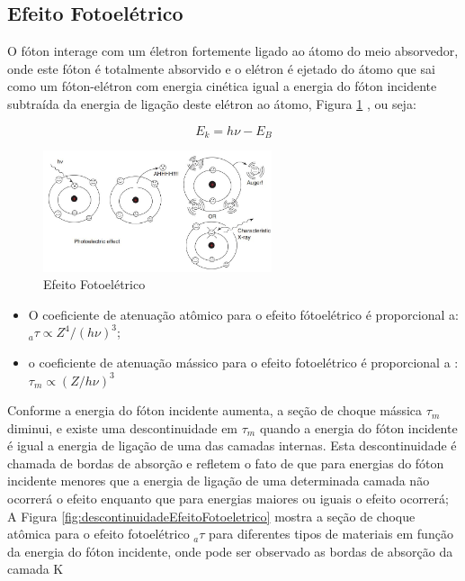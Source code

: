 \documentclass[11pt,a4paper]{article}
\begin{document}
        \subsection{Efeito Fotoelétrico}

            O fóton interage com um életron fortemente ligado ao átomo do meio absorvedor, onde este fóton é totalmente absorvido e o elétron é ejetado do átomo que sai como um fóton-elétron com energia cinética igual a energia do fóton incidente subtraída da energia de ligação deste elétron ao átomo, Figura \ref{fig:efeitoFotoeletrico} , ou seja:



                \begin{equation}
                    E_k = h\nu - E_B
                \end{equation}

                \begin{figure}[h]
                    \centering
                    \includegraphics[width=0.6\textwidth]{Imagens/efeitoFotoeletrico.JPG}
                    \caption{Efeito Fotoelétrico}
                    \label{fig:efeitoFotoeletrico}
                \end{figure}


            \begin{itemize}
                \item O coeficiente de atenuação atômico para o efeito fótoelétrico é proporcional a: ${}_a\tau \propto Z^4 / (h\nu)^3$;
                \item o coeficiente de atenuação mássico para o efeito fotoelétrico é proporcional a
                : $\tau_m \propto (Z / h\nu)^3$
            \end{itemize}

            Conforme a energia do fóton incidente aumenta, a seção de choque mássica $\tau_m$ diminui, e existe uma descontinuidade em $\tau_m$ quando a energia do fóton incidente é igual a energia de ligação de uma das camadas internas. Esta descontinuidade é chamada de bordas de absorção e refletem o fato de que para energias do fóton incidente menores que a energia de ligação de uma determinada camada não ocorrerá o efeito enquanto que para energias maiores ou iguais o efeito ocorrerá; A Figura \ref{fig:descontinuidadeEfeitoFotoeletrico} mostra a seção de choque atômica para o efeito fotoelétrico ${}_a\tau$ para diferentes tipos de materiais em função da energia do fóton incidente, onde pode ser observado as bordas de absorção da camada K
\end{document}
